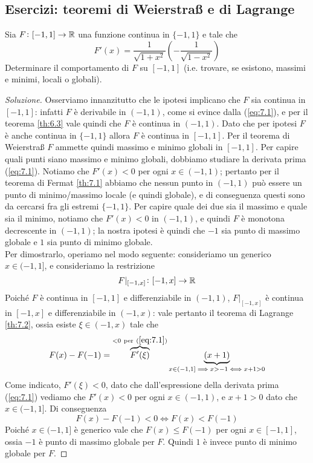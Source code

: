 \subsection{Esercizi: teoremi di \texorpdfstring{Weierstra{\ss}}{Weierstraß} e di Lagrange}
\begin{exercise}
    \label{ex:7.1}
    Sia $F\colon [-1, 1]\to \amsbb{R}$ una funzione continua in $\{-1, 1\}$ e tale che
    \begin{equation}
        \label{eq:7.1}
        F'(x) = \frac{1}{\sqrt{1+x^2}}\left(-\frac{1}{\sqrt{1-x^2}}\right)
    \end{equation}
    Determinare il comportamento di $F$ su $[-1, 1]$ (i.e. trovare, se esistono, massimi e minimi, locali o globali).
\end{exercise}
\begin{proof}[Soluzione]
    Osserviamo innanzitutto che le ipotesi implicano che $F$ sia continua in $[-1, 1]$: infatti $F$ è derivabile in $(-1, 1)$, come si evince dalla (\ref{eq:7.1}), e per il teorema \ref{th:6.3} vale quindi che $F$ è continua in $(-1, 1)$. Dato che per ipotesi $F$ è anche continua in $\{-1, 1\}$ allora $F$ è continua in $[-1, 1]$. Per il teorema di Weierstra{\ss} $F$ ammette quindi massimo e minimo globali in $[-1, 1]$. Per capire quali punti siano massimo e minimo globali, dobbiamo studiare la derivata prima (\ref{eq:7.1}). Notiamo che $F'(x)<0$ per ogni $x\in(-1,1)$; pertanto per il teorema di Fermat \ref{th:7.1} abbiamo che nessun punto in $(-1,1)$ può essere un punto di minimo/massimo locale (e quindi globale), e di conseguenza questi sono da cercarsi fra gli estremi $\{-1, 1\}$. Per capire quale dei due sia il massimo e quale sia il minimo, notiamo che $F'(x)<0$ in $(-1, 1)$, e quindi $F$ è monotona decrescente in $(-1,1)$; la nostra ipotesi è quindi che $-1$ sia punto di massimo globale e $1$ sia punto di minimo globale. \\
    Per dimostrarlo, operiamo nel modo seguente: consideriamo un generico $x\in(-1,1]$, e consideriamo la restrizione
    \[
    F|_{[-1,x]}\colon [-1,x]\to \amsbb{R}
    \]
    Poiché $F$ è continua in $[-1, 1]$ e differenziabile in $(-1, 1)$, $F|_{[-1, x]}$ è continua in $[-1, x]$ e differenziabile in $(-1, x)$: vale pertanto il teorema di Lagrange \ref{th:7.2}, ossia esiste $\xi\in(-1, x)$ tale che
    \[
    F(x)-F(-1) = \overbrace{F'(\xi)}^{<0 \ \text{per} \ (\ref{eq:7.1})}\underbrace{(x+1)}_{x\in(-1, 1] \implies x>-1 \iff x+1>0 }
    \]
    Come indicato, $F'(\xi)<0$, dato che dall'espressione della derivata prima (\ref{eq:7.1}) vediamo che $F'(x)<0$ per ogni $x\in(-1,1)$, e $x+1>0$ dato che $x\in(-1, 1]$. Di conseguenza
    \[
    F(x)-F(-1)<0 \iff F(x)<F(-1)
    \]
    Poiché $x\in(-1,1]$ è generico vale che $F(x)\le F(-1)$ per ogni $x\in[-1,1]$, ossia $-1$ è punto di massimo globale per $F$. Quindi $1$ è invece punto di minimo globale per $F$.
\end{proof}
